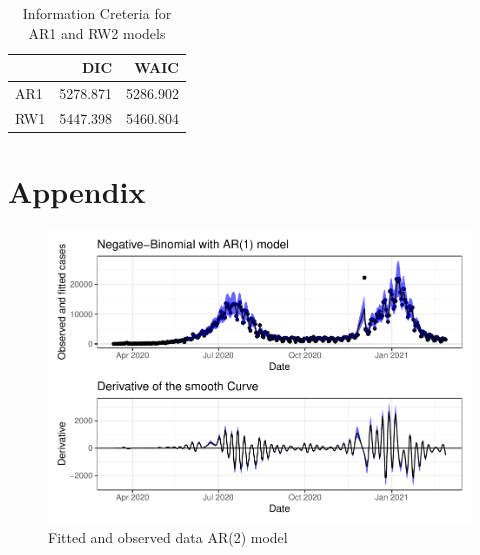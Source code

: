 \documentclass[10pt,letterpaper]{article}
\begin{document}
\begin{table}[!h]

\caption{\label{tab:unnamed-chunk-11}Information Creteria for AR1 and RW2 models}
\centering
\begin{tabular}[t]{l|r|r}
\hline
  & DIC & WAIC\\
\hline
AR1 & 5278.871 & 5286.902\\
\hline
RW1 & 5447.398 & 5460.804\\
\hline
\end{tabular}
\end{table}

\newpage

\hypertarget{appendix}{%
\section{Appendix}\label{appendix}}

\setcounter{table}{0} \renewcommand{\thetable}{S\arabic{table}} \setcounter{figure}{0} \renewcommand{\thefigure}{S\arabic{figure}}

\begin{figure}[H]
\includegraphics[width=0.99\linewidth]{COVIDincidenceSA_files/figure-latex/unnamed-chunk-12-1} \caption{Fitted and observed data AR(2) model}\label{fig:unnamed-chunk-12}
\end{figure}
\end{document}
